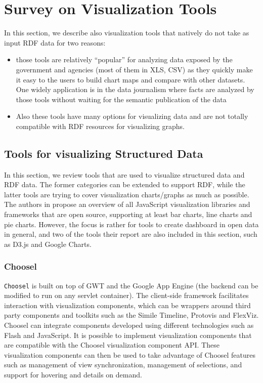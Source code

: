 \section{Survey on Visualization Tools}
\label{sec:visu-soa}

In this section, we describe also visualization tools that natively do not take as input RDF data for two reasons:
\begin{itemize}
 \item those tools are relatively ``popular'' for analyzing data exposed by the government and agencies  (most of them in XLS, CSV) as they quickly make it easy to the users  to build chart  maps and compare with other datasets. One widely application is in the data journalism  where facts are analyzed by those tools without waiting for the semantic publication of the data
 \item Also these tools have many options for visualizing data and are not totally compatible with RDF resources for visualizing graphs.
\end{itemize}

\subsection{Tools for visualizing Structured Data}
\label{sec:strucdataviz}
In this section, we review tools that are used to visualize structured data and RDF data. The former categories can be extended to support RDF, while the latter tools are trying to cover visualization charts/graphs as much as possible. The authors in \cite{odm14} propose an overview of all JavaScript visualization libraries and frameworks that are open source, supporting at least bar charts, line charts and pie charts. However, the focus is rather for tools to create dashboard in open data in general, and two of the tools their report are also included in this section, such as D3.js and Google Charts.

\subsubsection{Choosel}
\label{sec:choosel}
\texttt{Choosel} \cite{lars2010} is built on top of GWT  and the Google App Engine  (the backend can be modified to run on any servlet container). The client-side framework facilitates interaction with visualization components, which can be wrappers around third party components and toolkits such as the Simile Timeline, Protovis and FlexViz. Choosel can integrate components developed using different technologies such as Flash and JavaScript. It is possible to implement visualization components that are compatible with the Choosel visualization component API. These visualization components can then be used to take advantage of Choosel features such as management of view synchronization, management of selections, and support for hovering and details on demand.

